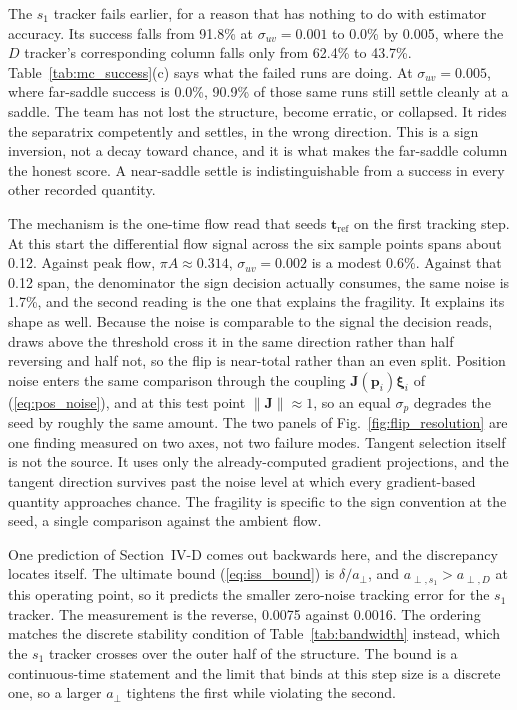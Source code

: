 \documentclass[lettersize,journal]{IEEEtran}
\begin{document}
The $s_1$ tracker fails earlier, for a reason that has nothing to do
with estimator accuracy. Its success falls from 91.8\% at $\sigma_{uv}
= 0.001$ to 0.0\% by 0.005, where the $D$ tracker's corresponding
column falls only from 62.4\% to 43.7\%. Table~\ref{tab:mc_success}(c)
says what the failed runs are doing. At $\sigma_{uv} = 0.005$, where
far-saddle success is 0.0\%, 90.9\% of those same runs still settle
cleanly at a saddle. The team has not lost the structure, become
erratic, or collapsed. It rides the separatrix competently and settles,
in the wrong direction. This is a sign inversion, not a decay toward
chance, and it is what makes the far-saddle column the honest score. A
near-saddle settle is indistinguishable from a success in every other
recorded quantity.

The mechanism is the one-time flow read that seeds
$\mathbf{t}_{\text{ref}}$ on the first tracking step. At this start the
differential flow signal across the six sample points spans about 0.12.
Against peak flow, $\pi A \approx 0.314$, $\sigma_{uv} = 0.002$ is a
modest 0.6\%. Against that 0.12 span, the denominator the sign decision
actually consumes, the same noise is 1.7\%, and the second reading is
the one that explains the fragility. It explains its shape as well.
Because the noise is comparable to the signal the decision reads, draws
above the threshold cross it in the same direction rather than half
reversing and half not, so the flip is near-total rather than an even
split. Position noise enters the same comparison through the coupling
$\mathbf{J}(\mathbf{p}_i)\boldsymbol{\xi}_i$ of (\ref{eq:pos_noise}),
and at this test point $\|\mathbf{J}\| \approx 1$, so an equal
$\sigma_p$ degrades the seed by roughly the same amount. The two panels
of Fig.~\ref{fig:flip_resolution} are one finding measured on two axes,
not two failure modes. Tangent selection itself is not the source. It
uses only the already-computed gradient projections, and the tangent
direction survives past the noise level at which every gradient-based
quantity approaches chance. The fragility is specific to the sign
convention at the seed, a single comparison against the ambient flow.

One prediction of Section~\mbox{IV-D} comes out backwards here, and the
discrepancy locates itself. The ultimate bound (\ref{eq:iss_bound}) is
$\delta/a_\perp$, and $a_{\perp,s_1} > a_{\perp,D}$ at this operating
point, so it predicts the smaller zero-noise tracking error for the
$s_1$ tracker. The measurement is the reverse, 0.0075 against 0.0016.
The ordering matches the discrete stability condition of
Table~\ref{tab:bandwidth} instead, which the $s_1$ tracker crosses over
the outer half of the structure. The bound is a continuous-time
statement and the limit that binds at this step size is a discrete one,
so a larger $a_\perp$ tightens the first while violating the second.
\end{document}
